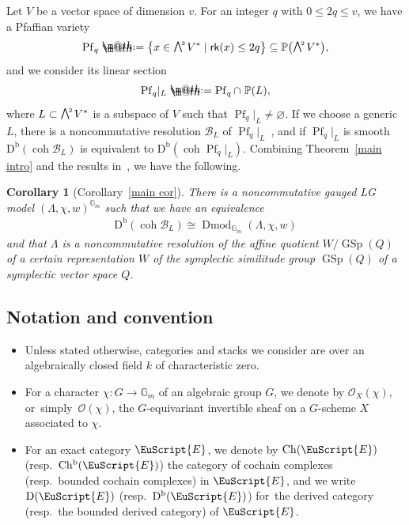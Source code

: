 \documentclass[10pt,a4paper]{amsart}
\makeatletter
\newtheorem{cor}[dfn]{Corollary}
\newcommand*{\defeq}{\mathrel{\rlap{%
 \raisebox{0.3ex}{$\m@th\cdot$}}%
 \raisebox{-0.3ex}{$\m@th\cdot$}}%
 =}
\numberwithin{equation}{section}
\newcommand{\Ch}{\operatorname{Ch}}
\newcommand{\Chb}{\operatorname{Ch^{b}}}
\newcommand{\Dmod}{\operatorname{Dmod}}
\newcommand{\coh}{\operatorname{coh}}
\newcommand{\Db}{\operatorname{D^b}}
\newcommand{\D}{\operatorname{D}}
\newcommand{\Pf}{\operatorname{Pf}}
\newcommand{\GSp}{\operatorname{GSp}}
\newcommand{\rk}{\operatorname{\sf rk}}
\newcommand{\cB}{\mathcal{B}}
\newcommand{\cO}{\mathcal{O}}
\newcommand{\bG}{\mathbb{G}}
\newcommand{\bP}{\mathbb{P}}
\newcommand{\scrE}{\EuScript{E}}
\newcommand{\gwedge}{\raisebox{1pt}[0pt][0pt]{$\textstyle \bigwedge^{\raisebox{-1pt}[0pt][0pt]{\tiny\!$2$\,}}$}}
\newcommand{\rest}{\!|_L}
\makeatother
\begin{document}
Let $V$ be a vector space of dimension $v$. For an integer $q$ with $0\leq 2q\leq v$, we have a Pfaffian variety
\begin{gather*}
\Pf_q\defeq\big\{x\in\gwedge V^* \mid \rk(x)\leq 2q\big\}\subseteq \bP\big(\gwedge V^*\big),
\end{gather*}
and we consider its linear section
\begin{gather*}
\Pf_q\rest\defeq\Pf_q\cap\,\,\bP(L),
\end{gather*}
where $L\subset \gwedge V^*$ is a subspace of $V$ such that $\Pf_q\rest\neq\varnothing$. If we choose a generic $L$, there is a noncommutative resolution $\cB_L$ of $\Pf_q\rest$~\cite{rsv,svdb}, and if $\Pf_q\rest$ is smooth $\Db(\coh\cB_L)$ is equivalent to $\Db(\coh\Pf_q\rest)$. Combining Theorem~\ref{main intro} and the results in~\cite{rs}, we have the following.
\begin{cor}[Corollary~\ref{main cor}]
There is a noncommutative gauged LG model $(\Lambda,\chi,w)^{\bG_m}$ such that we have an equivalence
\begin{gather*}
\Db(\coh \cB_L)\cong \Dmod_{\bG_m}(\Lambda,\chi,w)
\end{gather*}
and that $\Lambda$ is a noncommutative resolution of the affine quotient $W/\GSp(Q)$ of a certain representation $W$ of the symplectic similitude group $\GSp(Q)$ of a symplectic vector space $Q$.
\end{cor}

\subsection{Notation and convention}
\begin{itemize}\itemsep=0pt

\item Unless stated otherwise, categories and stacks we consider are over an algebraically closed field $k$ of characteristic zero.

\item For a character $\chi\colon G\to \bG_m$ of an algebraic group $G$, we denote by $\cO_X(\chi)$, or~sim\-ply~$\cO(\chi)$, the $G$-equivariant invertible sheaf on a $G$-scheme $X$ associated to $\chi$.

\item For an exact category $\scrE$, we denote by $\Ch(\scrE)$ (resp.\ $\Chb(\scrE)$) the category of cochain complexes (resp.\ bounded cochain complexes) in $\scrE$, and we write $\D(\scrE)$ (resp.\ $\Db(\scrE)$) for~the derived category (resp.\ the bounded derived category) of $\scrE$.
\end{itemize}
\end{document}
